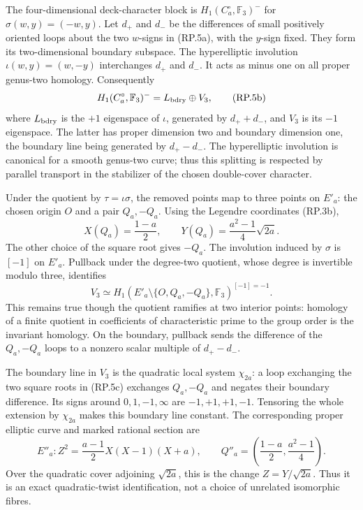 The four-dimensional deck-character block is
$H_1(C_a^\circ,\mathbb F_3)^-$ for
$\sigma(w,y)=(-w,y)$. Let $d_+$ and $d_-$ be the
differences of small positively oriented loops about
the two $w$-signs in (RP.5a), with the $y$-sign fixed.
They form its two-dimensional boundary subspace.
The hyperelliptic involution $\iota(w,y)=(w,-y)$
interchanges $d_+$ and $d_-$. It acts as minus one
on all proper genus-two homology. Consequently
\[
 H_1(C_a^\circ,\mathbb F_3)^-
       =L_{\rm bdry}\oplus V_3,
 \tag{RP.5b}
\]
where $L_{\rm bdry}$ is the $+1$ eigenspace of
$\iota$, generated by $d_++d_-$, and $V_3$ is its
$-1$ eigenspace. The latter has proper dimension
two and boundary dimension one, the boundary line
being generated by $d_+-d_-$. The hyperelliptic
involution is canonical for a smooth genus-two
curve; thus this splitting is respected by
parallel transport in the stabilizer of the
chosen double-cover character.

Under the quotient by $\tau=\iota\sigma$, the
removed points map to three points on $E'_a$:
the chosen origin $O$ and a pair $Q_a,-Q_a$.
Using the Legendre coordinates (RP.3b),
\[
 X(Q_a)=\frac{1-a}{2},\qquad
 Y(Q_a)=\frac{a^2-1}{4}\sqrt{2a}.
 \tag{RP.5c}
\]
The other choice of the square root gives $-Q_a$.
The involution induced by $\sigma$ is $[-1]$ on
$E'_a$. Pullback under the degree-two quotient,
whose degree is invertible modulo three, identifies
\[
 V_3\simeq H_1(E'_a\setminus\{O,Q_a,-Q_a\},
                         \mathbb F_3)^{[-1]=-1}.
 \tag{RP.5d}
\]
This remains true though the quotient ramifies at
two interior points: homology of a finite quotient
in coefficients of characteristic prime to the
group order is the invariant homology. On the
boundary, pullback sends the difference of the
$Q_a,-Q_a$ loops to a nonzero scalar multiple of
$d_+-d_-$.

The boundary line in $V_3$ is the quadratic local
system $\chi_{2a}$: a loop exchanging the two
square roots in (RP.5c) exchanges $Q_a,-Q_a$ and
negates their boundary difference. Its signs
around $0,1,-1,\infty$ are $-1,+1,+1,-1$.
Tensoring the whole extension by $\chi_{2a}$
makes this boundary line constant. The corresponding
proper elliptic curve and marked rational section are
\[
 \boxed{\quad
 E''_a:Z^2=\frac{a-1}{2}X(X-1)(X+a),\qquad
 Q''_a=\left(\frac{1-a}{2},\frac{a^2-1}{4}\right).
 \quad}
 \tag{RP.5e}
\]
Over the quadratic cover adjoining $\sqrt{2a}$,
this is the change $Z=Y/\sqrt{2a}$. Thus it is an
exact quadratic-twist identification, not a choice
of unrelated isomorphic fibres.

